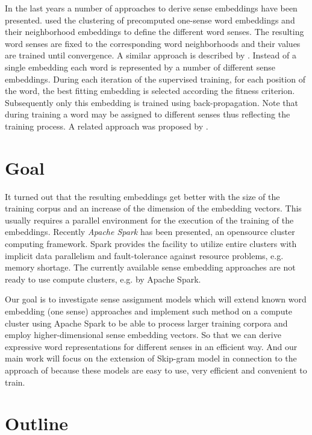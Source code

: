 In the last years a number of approaches to derive sense embeddings have been presented. \cite{HuangSocherEtAl2012} used the clustering of precomputed one-sense word embeddings and their neighborhood embeddings to define the different word senses. The resulting word senses are fixed to the corresponding word neighborhoods and their values are trained until convergence. A similar approach is described by \cite{ChenLiuEtAl2014}. Instead of a single embedding each word is represented by a number of different sense embeddings. During each iteration of the supervised training, for each position of the word, the best fitting embedding is selected according the fitness criterion. Subsequently only this embedding is trained using back-propagation. Note that during training a word may be assigned to different senses thus reflecting the training process. A related approach was proposed by \cite{TianDaiEtAl2014}.


\section{Goal}


It turned out that the resulting embeddings get better with the size of the training corpus and an increase of the dimension of the embedding vectors. This usually requires a parallel environment for the execution of the training of the embeddings. Recently \emph{Apache Spark} \citep{ZahariaChowdhuryEtAl2010} has been presented, an opensource cluster computing framework. Spark provides the facility to utilize entire clusters with implicit data parallelism and fault-tolerance against resource problems, e.g. memory shortage. The currently available sense embedding approaches are not ready to use compute clusters, e.g. by Apache Spark. 

Our goal is to investigate sense assignment models which will extend known word embedding (one sense) approaches and implement such method on a compute cluster using Apache Spark to be able to process larger training corpora and employ higher-dimensional sense embedding vectors. So that we can derive expressive word representations for different senses in an efficient way. And our main work will focus on the extension of Skip-gram model \citep{MikolovSutskeverEtAl2013} in connection to the approach of \citep{NeelakantanShankarEtAl2015} because these models are easy to use, very efficient and convenient to train. 


\section{Outline}

